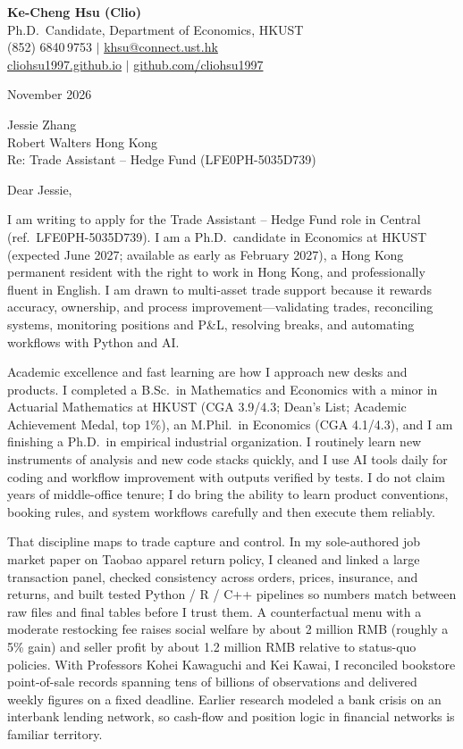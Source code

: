 \documentclass[11pt,letterpaper]{article}
\begin{document}
\noindent
{\bfseries Ke-Cheng Hsu (Clio)}\\
Ph.D.\ Candidate, Department of Economics, HKUST\\
(852) 6840\,9753 \quad $|$ \quad \href{mailto:khsu@connect.ust.hk}{khsu@connect.ust.hk}\\
\href{https://cliohsu1997.github.io/}{cliohsu1997.github.io} \quad $|$ \quad \href{https://github.com/cliohsu1997}{github.com/cliohsu1997}

\vspace{0.4em}
 November 2026

\vspace{0.3em}
\noindent
Jessie Zhang\\
Robert Walters Hong Kong\\
Re: Trade Assistant -- Hedge Fund (LFE0PH-5035D739)

\vspace{0.15em}
Dear Jessie,

I am writing to apply for the Trade Assistant -- Hedge Fund role in Central (ref.\ LFE0PH-5035D739). I am a Ph.D.\ candidate in Economics at HKUST (expected June 2027; available as early as February 2027), a Hong Kong permanent resident with the right to work in Hong Kong, and professionally fluent in English. I am drawn to multi-asset trade support because it rewards accuracy, ownership, and process improvement---validating trades, reconciling systems, monitoring positions and P\&L, resolving breaks, and automating workflows with Python and AI.

Academic excellence and fast learning are how I approach new desks and products. I completed a B.Sc.\ in Mathematics and Economics with a minor in Actuarial Mathematics at HKUST (CGA 3.9/4.3; Dean's List; Academic Achievement Medal, top 1\%), an M.Phil.\ in Economics (CGA 4.1/4.3), and I am finishing a Ph.D.\ in empirical industrial organization. I routinely learn new instruments of analysis and new code stacks quickly, and I use AI tools daily for coding and workflow improvement with outputs verified by tests. I do not claim years of middle-office tenure; I do bring the ability to learn product conventions, booking rules, and system workflows carefully and then execute them reliably.

That discipline maps to trade capture and control. In my sole-authored job market paper on Taobao apparel return policy, I cleaned and linked a large transaction panel, checked consistency across orders, prices, insurance, and returns, and built tested Python / R / C++ pipelines so numbers match between raw files and final tables before I trust them. A counterfactual menu with a moderate restocking fee raises social welfare by about 2 million RMB (roughly a 5\% gain) and seller profit by about 1.2 million RMB relative to status-quo policies. With Professors Kohei Kawaguchi and Kei Kawai, I reconciled bookstore point-of-sale records spanning tens of billions of observations and delivered weekly figures on a fixed deadline. Earlier research modeled a bank crisis on an interbank lending network, so cash-flow and position logic in financial networks is familiar territory.
\end{document}
